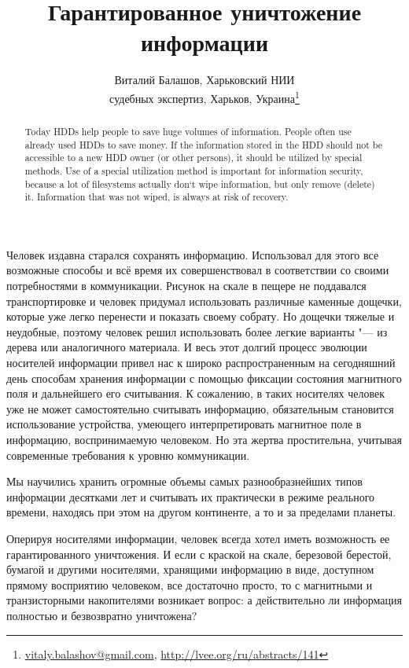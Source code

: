 \documentclass[10pt, a5paper]{article}
\begin{document}
\title{Гарантированное уничтожение информации}
\author{Виталий Балашов, Харьковский НИИ \\ судебных экспертиз, Харьков, Украина\footnote{\url{vitaly.balashov@gmail.com}, \url{http://lvee.org/ru/abstracts/141}}}
\maketitle
\begin{abstract}
Today HDDs help people to save huge volumes of information.  People often use already used HDDs to save money. If the infor\-mation stored in the HDD should not be accessible to a new HDD owner (or other persons), it should be utilized by special methods. Use of a special utilization method is important for information security, because a lot of filesystems actually don`t wipe information, but only remove (delete) it. Information that was not wiped, is always at risk of recovery.  
\end{abstract}
Человек издавна старался сохранять информацию. Использовал для этого все возможные способы и всё время их совершенствовал в соответствии со своими потребностями в коммуникации. Рисунок на скале в пещере не поддавался транспортировке и человек придумал использовать различные каменные дощечки, которые уже легко перенести и показать своему собрату. Но дощечки тяжелые и неудобные, поэтому человек решил использовать более легкие варианты "--- из дерева или аналогичного материала.  И весь этот долгий процесс эволюции носителей информации привел нас к широко распространенным на сегодняшний день способам хранения информации с помощью фиксации состояния магнитного поля  и дальнейшего его считывания.  К сожалению, в таких носителях человек уже не может самостоятельно считывать информацию, обязательным становится использование устройства, умеющего интерпретировать магнитное поле в информацию, воспринимаемую человеком. Но эта жертва простительна, учитывая современные требования к уровню коммуникации.

Мы научились хранить огромные объемы самых разнообразнейших типов информации десятками лет и считывать их практически в режиме реального времени, находясь при этом на другом континенте, а то и за пределами планеты.

Оперируя носителями информации, человек всегда хотел иметь возможность ее гарантированного уничтожения. И если с краской на скале, березовой берестой, бумагой и другими носителями, хранящими информацию в виде, доступном прямому восприятию человеком, все достаточно просто, то с магнитными и транзисторными накопителями возникает вопрос: а действительно ли информация полностью и безвозвратно уничтожена?
\end{document}
